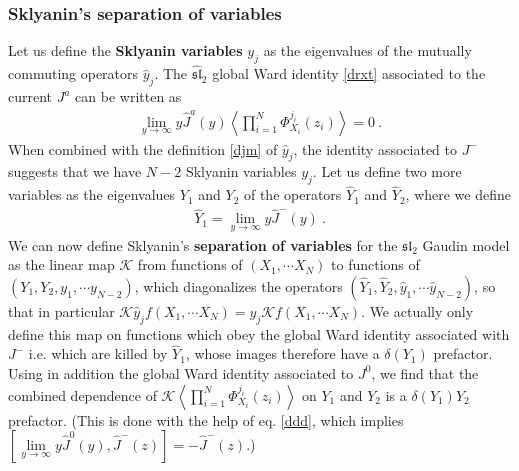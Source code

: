 \documentclass[12pt, a4paper, notitlepage, twoside]{report}
\numberwithin{equation}{section}
\theoremstyle{break}
\begin{document}
\subsubsection{Sklyanin's separation of variables}

Let us define the
\textbf{\boldmath Sklyanin variables} $y_j$ as the eigenvalues of the mutually commuting operators $\hat{y}_j$. 
The $\widehat{\mathfrak{sl}}_2$ global Ward identity \eqref{drxt} associated to the current $J^a$ can be written as 
\begin{align}
 \underset{y\to \infty}{\lim} y \hat{J}^a(y) \left\langle \prod_{i=1}^N \Phi^{j_i}_{X_i}(z_i)\right\rangle = 0\ .
\end{align}
When combined with the definition \eqref{djm} of $\hat{y}_j$, the identity associated to $J^-$ suggests that we have $N-2$ Sklyanin variables $y_j$.
Let us define two more variables as the eigenvalues $Y_1$ and $Y_2$ of the operators $\hat{Y}_1$ and $\hat{Y}_2$, where we define
\begin{align}
 \hat{Y}_1 = \underset{y\to \infty}{\lim} y \hat{J}^-(y)\ .
\end{align}
We can now define Sklyanin's \textbf{\boldmath separation of variables} for the $\mathfrak{sl}_2$ Gaudin model as the linear 
map $\mathcal{K}$ from functions of $(X_1,\cdots X_N)$ to functions of $(Y_1,Y_2,y_1,\cdots y_{N-2})$, which diagonalizes the operators $(\hat{Y}_1,\hat{Y}_2,\hat{y}_1,\cdots \hat{y}_{N-2})$, so that in particular $\mathcal{K} \hat{y}_j f(X_1,\cdots X_N) = y_j \mathcal{K} f(X_1,\cdots X_N)$.
We actually only define this map on 
functions which obey the global Ward identity associated with $J^-$ i.e.
which are killed by $\hat{Y}_1$, whose images therefore have a $\delta(Y_1)$ prefactor.
Using in addition the global Ward identity associated to $J^0$, we find that the combined dependence of $\mathcal{K}\left\langle \prod_{i=1}^N \Phi^{j_i}_{X_i}(z_i)\right\rangle$ on $Y_1$ and $Y_2$ is a $\delta(Y_1)Y_2$ prefactor.
(This is done with the help of eq. \eqref{ddd}, which implies $[\underset{y\to \infty}{\lim} y \hat{J}^0(y),\hat{J}^-(z)]=-\hat{J}^-(z)$.)
\end{document}
